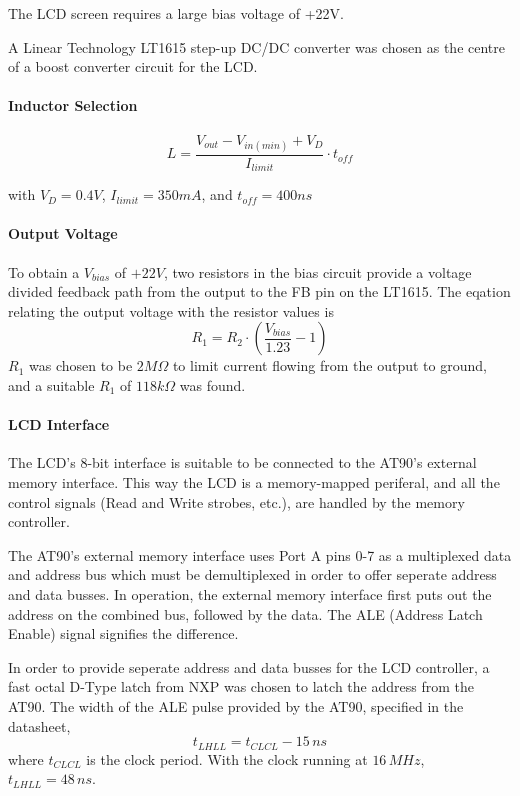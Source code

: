 \documentclass[a4paper,10pt]{scrreprt}
\begin{document}
The LCD screen requires a large bias voltage of +22V.

A Linear Technology LT1615 step-up DC/DC converter was chosen as the centre of a boost converter circuit for the LCD.

\paragraph{Inductor Selection}

\begin{equation}
 L=\frac{V_{out}-V_{in(min)}+V_D}{I_{limit}}\cdot t_{off}
\end{equation}

with $V_D=0.4V$, $I_{limit}=350mA$, and $t_{off}=400ns$

\paragraph{Output Voltage}

To obtain a $V_{bias}$ of $+22V$, two resistors in the bias circuit provide a voltage divided feedback path from the output to the FB pin on the LT1615. The eqation relating the output voltage with the resistor values is
\begin{equation}
  R_1=R_2\cdot \left(\frac{V_{bias}}{1.23}-1\right)
\end{equation}
$R_1$ was chosen to be $2M\Omega$ to limit current flowing from the output to ground, and a suitable $R_1$ of $118k\Omega$ was found.

\paragraph{LCD Interface}
The LCD's 8-bit interface is suitable to be connected to the AT90's external memory interface. This way the LCD is a memory-mapped periferal, and all the control signals (Read and Write strobes, etc.), are handled by the memory controller.

The AT90's external memory interface uses Port A pins 0-7 as a multiplexed data and address bus which must be demultiplexed in order to offer seperate address and data busses. In operation, the external memory interface first puts out the address on the combined bus, followed by the data. The ALE (Address Latch Enable) signal signifies the difference.

In order to provide seperate address and data busses for the LCD controller, a fast octal D-Type latch from NXP was chosen to latch the address from the AT90. The width of the ALE pulse provided by the AT90, specified in the datasheet,
\begin{equation}
 t_{LHLL}=t_{CLCL}-15\,ns
\end{equation}
where $t_{CLCL}$ is the clock period. With the clock running at $16\,MHz$, $t_{LHLL}=48\,ns$.
\end{document}
